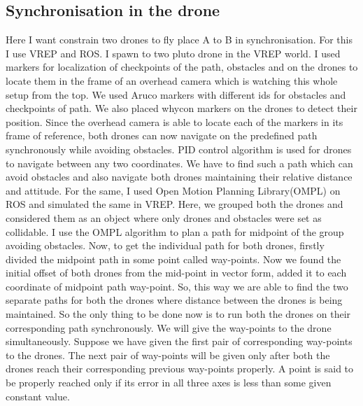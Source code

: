 \subsection{Synchronisation in the drone}
Here I want constrain two drones to fly place A to B in synchronisation. For this I use VREP and ROS. I spawn to two pluto drone in the VREP world. I used markers for localization of checkpoints of the path, obstacles and on the drones to locate them in the frame of an overhead camera which is watching this whole setup from the top. We used Aruco markers with different ids for obstacles and checkpoints of path. We also placed whycon markers on the drones to detect their position. Since the overhead camera is able to locate each of the markers in its frame of reference, both drones can now navigate on the predefined path synchronously while avoiding obstacles. PID control algorithm is used for drones to navigate between any two coordinates. We have to find such a path which can avoid obstacles and also navigate both drones maintaining their relative distance and attitude. For the same, I used Open Motion Planning Library(OMPL) on ROS and simulated the same in VREP. Here, we grouped both the drones and considered them as an object where only drones and obstacles were set as collidable. I use the OMPL algorithm to plan a path for midpoint of the group avoiding obstacles. Now, to get the individual path for both drones, firstly divided the midpoint path in some point called way-points. Now we found the initial offset of both drones from the mid-point in vector form, added it to each coordinate of midpoint path way-point. So, this way we are able to find the two separate paths for both the drones where distance between the drones is being maintained. So the only thing to be done now is to run both the drones on their corresponding path synchronously. We will give the way-points to the drone simultaneously. Suppose we have given the first pair of corresponding way-points to the drones. The next pair of way-points will be given only after both the drones reach their corresponding previous way-points properly. A point is said to be properly reached only if its error in all three axes is less than some given constant value.


